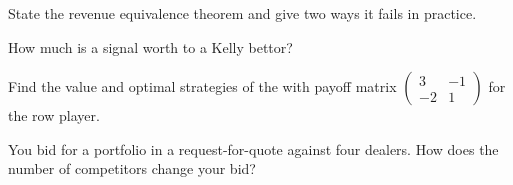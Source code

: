 \begin{interviewq}\label{iq:qm:games-auctions-and-information:3}
State the revenue equivalence theorem and give two ways it fails in practice.
\end{interviewq}

\begin{interviewq}\label{iq:qm:games-auctions-and-information:4}
How much is a signal worth to a Kelly bettor?
\end{interviewq}

\begin{interviewq}\label{iq:qm:games-auctions-and-information:5}
Find the value and optimal strategies of the  with payoff matrix $\begin{pmatrix}3 & -1\\ -2 & 1\end{pmatrix}$ for the row player.
\end{interviewq}

\begin{interviewq}\label{iq:qm:games-auctions-and-information:6}
You bid for a portfolio in a request-for-quote against four dealers. How does the number of competitors change your bid?
\end{interviewq}
